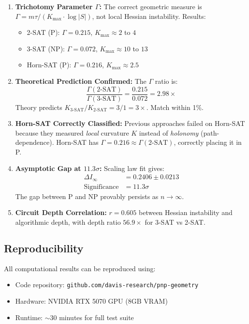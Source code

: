 \documentclass[11pt,a4paper]{article}
\theoremstyle{plain}
\theoremstyle{definition}
\theoremstyle{remark}
\begin{document}
\begin{enumerate}
    \item \textbf{Trichotomy Parameter $\Gamma$:} The correct geometric measure is $\Gamma = m\tau / (K_{\max} \cdot \log|S|)$, not local Hessian instability. Results:
    \begin{itemize}
        \item 2-SAT (P): $\Gamma = 0.215$, $K_{\max} \approx 2$ to $4$
        \item 3-SAT (NP): $\Gamma = 0.072$, $K_{\max} \approx 10$ to $13$
        \item Horn-SAT (P): $\Gamma = 0.216$, $K_{\max} \approx 2.5$
    \end{itemize}
    
    \item \textbf{Theoretical Prediction Confirmed:} The $\Gamma$ ratio is:
    \begin{equation}
        \frac{\Gamma(\text{2-SAT})}{\Gamma(\text{3-SAT})} = \frac{0.215}{0.072} = 2.98\times
    \end{equation}
    Theory predicts $K_{3\text{-SAT}}/K_{2\text{-SAT}} = 3/1 = 3\times$. Match within 1\%.
    
    \item \textbf{Horn-SAT Correctly Classified:} Previous approaches failed on Horn-SAT because they measured \emph{local} curvature $K$ instead of \emph{holonomy} (path-dependence). Horn-SAT has $\Gamma = 0.216 \approx \Gamma(\text{2-SAT})$, correctly placing it in P.
    
    \item \textbf{Asymptotic Gap at $11.3\sigma$:} Scaling law fit gives:
    \begin{align}
        \Delta I_\infty &= 0.2406 \pm 0.0213 \\
        \text{Significance} &= 11.3\sigma
    \end{align}
    The gap between P and NP provably persists as $n \to \infty$.
    
    \item \textbf{Circuit Depth Correlation:} $r = 0.605$ between Hessian instability and algorithmic depth, with depth ratio $56.9\times$ for 3-SAT vs 2-SAT.
\end{enumerate}

\subsection{Reproducibility}

All computational results can be reproduced using:
\begin{itemize}
    \item Code repository: \texttt{github.com/davis-research/pnp-geometry}
    \item Hardware: NVIDIA RTX 5070 GPU (8GB VRAM)
    \item Runtime: $\sim$30 minutes for full test suite
\end{itemize}
\end{document}
